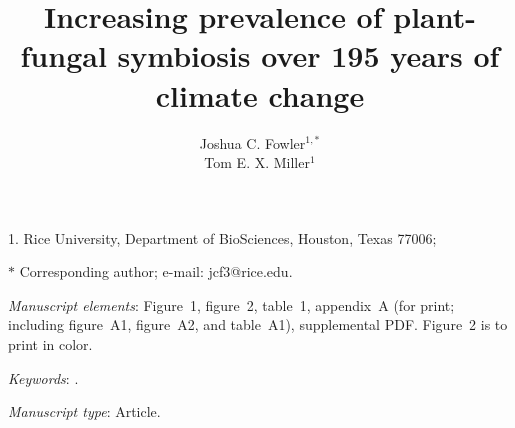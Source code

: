 \documentclass[11pt]{article}
\title{Increasing prevalence of plant-fungal symbiosis over 195 years of climate change}
\author{Joshua C. Fowler$^{1,\ast}$ \\
	Tom E. X. Miller$^{1}$}
\date{}
\begin{document}
	
	\maketitle
	
	\noindent{} 1. Rice University, Department of BioSciences, Houston, Texas 77006;


	\noindent{} $\ast$ Corresponding author; e-mail: jcf3@rice.edu.
	
	\bigskip
	
	\textit{Manuscript elements}: Figure~1, figure~2, table~1, appendix~A (for print; including figure~A1, figure~A2, and table~A1), supplemental PDF. Figure~2 is to print in color.
	
	\bigskip
	
	\textit{Keywords}: .
	
	\bigskip
	
	\textit{Manuscript type}: Article. %
	
	\bigskip
	
	
	
	\newpage{}
	
\end{document}
